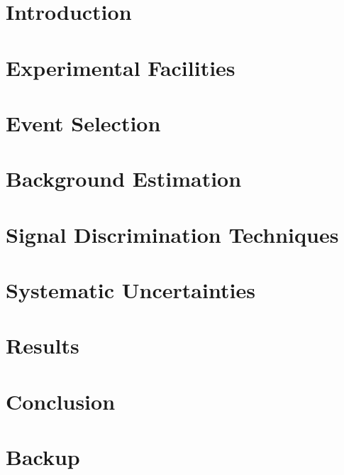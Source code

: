 \documentclass[compress,10pt,dvipsnames]{Presentation}
\begin{document}
\section[Intro.]{Introduction}
\label{sec:intro}


\section[Facilities]{Experimental Facilities}
\label{sec:experiment}


\section[Evt. Sel.]{Event Selection}
\label{sec:event_selection}


\section[Bkg. Est.]{Background Estimation}
\label{sec:background_estimation}


\section[MVA]{Signal Discrimination Techniques}
\label{sec:mem}

\label{sec:signal_extraction}


\section[Sys.]{Systematic Uncertainties}
\label{sec:systematics}


\section[Res.]{Results}
\label{sec:limits}


\section[Conc.]{Conclusion}
\label{sec:conclusion}


\section*{Backup}
\label{sec:backup}

\end{document}
